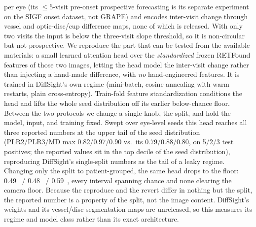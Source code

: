 per eye (its $\leq$\num{5}-visit pre-onset prospective forecasting is its separate experiment on the SIGF onset dataset,
not GRAPE) and encodes inter-visit change through vessel and optic-disc/cup difference maps, none of which is released.
With only two visits the input is below the three-visit slope threshold, so it is non-circular but not prospective. We reproduce
the part that can be tested from the available materials: a small learned attention head over the \emph{standardized} frozen RETFound features of those
two images, letting the head model the inter-visit change rather than injecting a hand-made difference, with \emph{no}
hand-engineered features. It is trained in DiffSight's own regime (mini-batch, cosine annealing with warm restarts,
plain cross-entropy). Train-fold feature standardization conditions the head and lifts the whole seed distribution off
its earlier below-chance floor. Between the two protocols we change a single knob, the split, and hold the model,
input, and training fixed. Swept over eye-level seeds this head reaches all three reported numbers at the upper tail of
the seed distribution (PLR2/PLR3/MD max \num{0.82}/\num{0.97}/\num{0.90} vs.\ its \num{0.79}/\num{0.88}/\num{0.80}, on
\num{5}/\num{2}/\num{3} test positives; the reported values sit in the top decile of the seed distribution),
reproducing DiffSight's single-split numbers as the tail of a leaky regime. Changing only the split to patient-grouped,
the same head drops to the floor: \num{0.49}~ / \num{0.48}~ / \num{0.59}~,
every interval spanning chance and none clearing the camera floor. Because the reproduce and the revert differ in nothing but the split, the reported number is a property of the
split, not the image content. DiffSight's weights and its vessel/disc segmentation maps are unreleased, so this measures
its regime and model class rather than its exact architecture.

